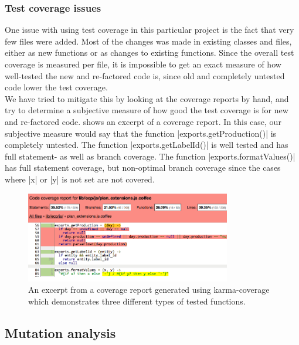 \subsubsection{Test coverage issues}

One issue with using test coverage in this particular project is the
fact that very few files were added. Most of the changes was made in
existing classes and files, either as new functions or as changes to
existing functions. Since the overall test coverage is measured per
file, it is impossible to get an exact measure of how well-tested the
new and re-factored code is, since old and completely untested code
lower the test coverage.\\

We have tried to mitigate this by looking at the coverage reports by
hand, and try to determine a subjective measure of how good the test
coverage is for new and re-factored code. 
shows an excerpt of a coverage report. In this case, our subjective
measure would say that the function |exports.getProduction()| is
completely untested. The function |exports.getLabelId()| is well tested
and has full statement- as well as branch coverage. The function
|exports.formatValues()| has full statement coverage, but non-optimal
branch coverage since the cases where |x| or |y| is not set are not
covered.\\

\begin{figure}
\centering
\includegraphics[width=0.8\textwidth]{results/choices/js_coverage}
\caption{An excerpt from a coverage report generated using karma-coverage
         which demonstrates three different types of tested functions.}
\label{fig:coverage_example}
\end{figure}


\subsection{Mutation analysis}
\label{sec:choices_mutation}

